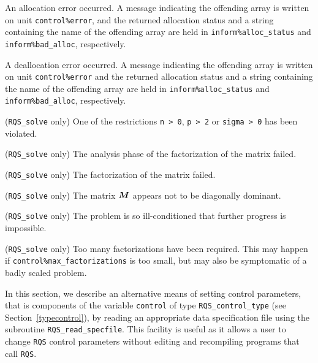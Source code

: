 \documentclass{galahad}
\newcommand{\packagename}{RQS}
\begin{document}
\begin{description}
 An allocation error occurred. A message indicating
the offending
array is written on unit {\tt control\%error}, and the returned allocation
status and a string containing the name of the offending array
are held in {\tt inform\%alloc\_\-status}
and {\tt inform\%bad\_alloc}, respectively.

 A deallocation error occurred.
A message indicating the offending
array is written on unit {\tt control\%error} and the returned allocation
status and a string containing the name of the offending array
are held in {\tt inform\%alloc\_\-status}
and {\tt inform\%bad\_alloc}, respectively.

 ({\tt \packagename\_solve} only)
One of the restrictions
{\tt n > 0},
{\tt p > 2}
or
{\tt sigma > 0}
has been violated.

 ({\tt \packagename\_solve} only)
The analysis phase of the factorization of the matrix  failed.

 ({\tt \packagename\_solve} only)
The factorization of the matrix  failed.

 ({\tt \packagename\_solve} only)
The matrix ${\bm{M}}$ appears not to be diagonally dominant.

 ({\tt \packagename\_solve} only)
The problem is so ill-conditioned that further progress is impossible.

 ({\tt \packagename\_solve} only)
Too many factorizations have been required.  This may happen if
    {\tt control\%max\_factorizations} is too small,
    but may also be symptomatic of a badly scaled problem.

\end{description}


\galfeatures
\noindent In this section, we describe an alternative means of setting
control parameters, that is components of the variable {\tt control} of type
{\tt \packagename\_control\_type}
(see Section~\ref{typecontrol}),
by reading an appropriate data specification file using the
subroutine {\tt \packagename\_read\_specfile}. This facility
is useful as it allows a user to change  {\tt \packagename} control parameters
without editing and recompiling programs that call {\tt \packagename}.
\end{document}
